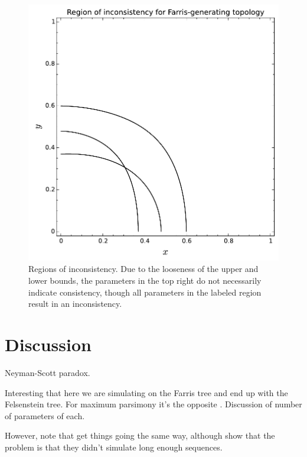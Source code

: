 \documentclass{article}
\begin{document}
\begin{figure}
\centering
\includegraphics[width=.9\textwidth]{analytic-inconsistency}
\caption{
    Regions of inconsistency.
    Due to the looseness of the upper and lower bounds, the parameters in the top right do not necessarily indicate consistency, though all parameters in the labeled region result in an inconsistency.
}
\label{fig:inconsistency-farris}
\end{figure}

\section{Discussion}

Neyman-Scott paradox.

Interesting that here we are simulating on the Farris tree and end up with the Felsenstein tree.
For maximum parsimony it's the opposite \cite{Felsenstein1978-rr}.
Discussion of number of parameters of each.

However, note that \cite{Siddall1998-hq} get things going the same way, although \cite{Swofford2001-hr} show that the problem is that they didn't simulate long enough sequences.





\newpage


\end{document}
